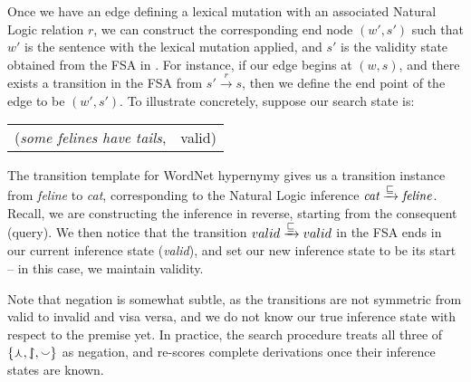 Once we have an edge defining a lexical mutation with
  an associated Natural Logic relation $r$, we can construct the 
  corresponding end node
  $(w', s')$ such that $w'$ is the sentence with the lexical mutation
  applied, and $s'$ is the validity state obtained from the
  FSA in .
For instance, if our edge begins at $(w, s)$, and there exists
  a transition in the FSA from $s' \xrightarrow{r} s$, then we
  define the end point of the edge to be $(w', s')$.
To illustrate concretely, suppose our search state is:

\vspace{0.5em}
\begin{tabular}{lr}
(\textit{some felines have tails}, & valid)
\end{tabular}
\vspace{0.5em}

The transition template for WordNet hypernymy gives us a transition
  instance from \textit{feline} to \textit{cat}, corresponding to the
  Natural Logic inference 
  $\textit{cat} \xrightarrow{\sqsubseteq} \textit{feline}$.
Recall, we are constructing the inference in reverse, starting from
  the consequent (query).
We then notice that the transition 
  $valid \xrightarrow{\sqsubseteq} valid$ in the FSA ends in our current
  inference state (\textit{valid}), and set our new inference state to 
  be its start -- in this case, we maintain validity.

Note that negation is somewhat subtle, as the transitions are not
  symmetric from valid to invalid and visa versa, and we do not know
  our true inference state with respect to the premise
  yet.
In practice, the search procedure treats all three of
  $\{\curlywedge, \downharpoonleft\hspace{-1.25mm}\upharpoonright, \smallsmile\}$ as negation, and re-scores complete
  derivations once their inference states are known.

